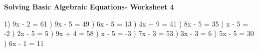 \documentclass{article}%
\begin{document}
\newline%
\newline%
\newline%
\pagebreak%
\large%
\begin{center}%
\textbf{Solving Basic Algebraic Equations- Worksheet 4}%
\newline%
\newline%
\newline%
\end{center} \normalsize%
1) 9x - 2 = 61%
\newline%
\newline%
) 9x - 5 = 49%
\newline%
\newline%
) 6x - 5 = 13%
\newline%
\newline%
) 4x + 9 = 41%
\newline%
\newline%
) 8x - 5 = 35%
\newline%
\newline%
) x - 5 = -2%
\newline%
\newline%
) 2x - 5 = 5%
\newline%
\newline%
) 9x + 4 = 58%
\newline%
\newline%
) x - 5 = -3%
\newline%
\newline%
) 7x - 3 = 53%
\newline%
\newline%
) 3x - 3 = 6%
\newline%
\newline%
) 5x - 5 = 30%
\newline%
\newline%
) 6x - 1 = 11%
\newline%
\newline%
\end{document}

